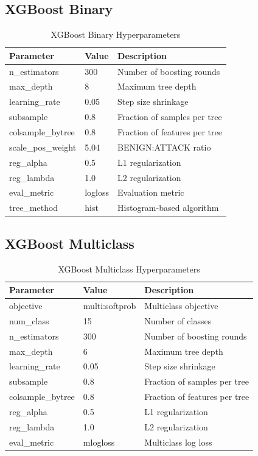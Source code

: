\documentclass[12pt,a4paper]{article}
\begin{document}
\subsection{XGBoost Binary}
\begin{table}[H]
\centering
\caption{XGBoost Binary Hyperparameters}
\begin{tabular}{|l|l|p{5cm}|}
\hline
\textbf{Parameter} & \textbf{Value} & \textbf{Description} \\
\hline
n\_estimators & 300 & Number of boosting rounds \\
max\_depth & 8 & Maximum tree depth \\
learning\_rate & 0.05 & Step size shrinkage \\
subsample & 0.8 & Fraction of samples per tree \\
colsample\_bytree & 0.8 & Fraction of features per tree \\
scale\_pos\_weight & 5.04 & BENIGN:ATTACK ratio \\
reg\_alpha & 0.5 & L1 regularization \\
reg\_lambda & 1.0 & L2 regularization \\
eval\_metric & logloss & Evaluation metric \\
tree\_method & hist & Histogram-based algorithm \\
\hline
\end{tabular}
\end{table}

\subsection{XGBoost Multiclass}
\begin{table}[H]
\centering
\caption{XGBoost Multiclass Hyperparameters}
\begin{tabular}{|l|l|p{5cm}|}
\hline
\textbf{Parameter} & \textbf{Value} & \textbf{Description} \\
\hline
objective & multi:softprob & Multiclass objective \\
num\_class & 15 & Number of classes \\
n\_estimators & 300 & Number of boosting rounds \\
max\_depth & 6 & Maximum tree depth \\
learning\_rate & 0.05 & Step size shrinkage \\
subsample & 0.8 & Fraction of samples per tree \\
colsample\_bytree & 0.8 & Fraction of features per tree \\
reg\_alpha & 0.5 & L1 regularization \\
reg\_lambda & 1.0 & L2 regularization \\
eval\_metric & mlogloss & Multiclass log loss \\
\hline
\end{tabular}
\end{table}
\end{document}
